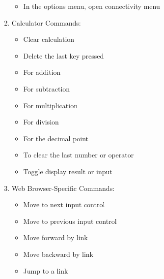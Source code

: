 \documentclass[10pt,letterpaper,twoside]{report}
\begin{document}
\begin{enumerate}
\begin{itemize}
		      \item In the options menu, open connectivity menu 
	      \end{itemize}
	\item Calculator Commands:
	      \begin{itemize}
		      \item Clear calculation 
		      \item Delete the last key pressed 
		      \item For addition  
		      \item For subtraction 
		      \item For multiplication 
		      \item For division 
		      \item For the decimal point 
		      \item To clear the last number or operator 
		      \item Toggle display result or input 
	      \end{itemize}
	\item Web Browser-Specific Commands:
	      \begin{itemize}
		      \item Move to next input control 
		      \item Move to previous input control 
		      \item Move forward by link 
		      \item Move backward by link 
		      \item Jump to a link 

\end{itemize}
\end{enumerate}
\end{document}
